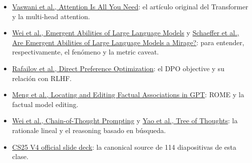 \begin{itemize}
  \item \href{https://arxiv.org/abs/1706.03762}{Vaswani et al., Attention Is All You Need}: el artículo original del Transformer y la multi-head attention.
  \item \href{https://arxiv.org/abs/2206.07682}{Wei et al., Emergent Abilities of Large Language Models} y \href{https://arxiv.org/abs/2304.15004}{Schaeffer et al., Are Emergent Abilities of Large Language Models a Mirage?}: para entender, respectivamente, el fenómeno y la metric caveat.
  \item \href{https://arxiv.org/abs/2305.18290}{Rafailov et al., Direct Preference Optimization}: el DPO objective y su relación con RLHF.
  \item \href{https://arxiv.org/abs/2202.05262}{Meng et al., Locating and Editing Factual Associations in GPT}: ROME y la factual model editing.
  \item \href{https://arxiv.org/abs/2201.11903}{Wei et al., Chain-of-Thought Prompting} y \href{https://arxiv.org/abs/2305.10601}{Yao et al., Tree of Thoughts}: la rationale lineal y el reasoning basado en búsqueda.
  \item \href{https://docs.google.com/presentation/d/1oXPs3LXtIVIsVbwTyGjAWj_aWvak9c1uNC4uhkS6glk/edit}{CS25 V4 official slide deck}: la canonical source de 114 diapositivas de esta clase.
\end{itemize}


